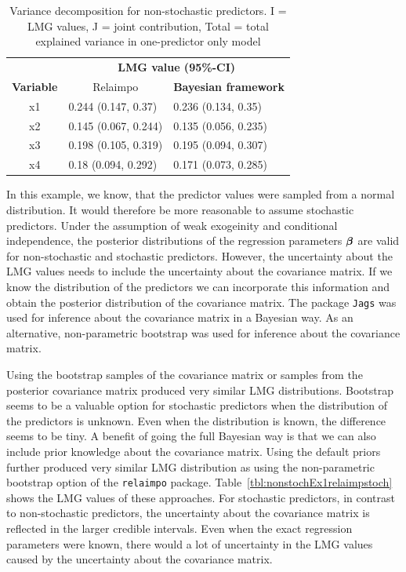 \documentclass[11pt,a4paper,twoside]{book}\usepackage[]{graphicx}\usepackage[]{color}
\begin{document}
\begin{table}[h]
\caption{Variance decomposition for non-stochastic predictors. I = LMG values, J = joint contribution, Total = total explained variance in one-predictor only model}
\centering
\begin{tabular}{cll}
   \toprule
   &\multicolumn{2}{c}{\textbf{LMG value (95\%-CI)}} \\
 \textbf{Variable} & \multicolumn{1}{c}{Relaimpo} & \textbf{Bayesian framework}  \\
  \hline
x1 & 0.244 (0.147, 0.37)  & 0.236 (0.134, 0.35)  \\ 
x2 & 0.145 (0.067, 0.244)  & 0.135 (0.056, 0.235)   \\ 
x3 & 0.198 (0.105, 0.319)  & 0.195 (0.094, 0.307)  \\ 
x4 & 0.18 (0.094, 0.292) & 0.171 (0.073, 0.285)  \\ 
   \bottomrule
\end{tabular}
\label{tbl:nonstochEx1relamip}
\end{table}

\FloatBarrier


In this example, we know, that the predictor values were sampled from a normal distribution. It would therefore be more reasonable to assume stochastic predictors. Under the assumption of weak exogeinity and conditional independence, the posterior distributions of the regression parameters ${\boldsymbol{\beta}}$ are valid for non-stochastic and stochastic predictors. However, the uncertainty about the LMG values needs to include the uncertainty about the covariance matrix. If we know the distribution of the predictors we can incorporate this information and obtain the posterior distribution of the covariance matrix. The package \texttt{Jags} was used for inference about the covariance matrix in a Bayesian way. As an alternative, non-parametric bootstrap was used for inference about the covariance matrix. 

Using the bootstrap samples of the covariance matrix or samples from the posterior covariance matrix produced  very similar LMG distributions. Bootstrap seems to be a valuable option for stochastic predictors when the distribution of the predictors is unknown. Even when the distribution is known, the difference seems to be tiny. A benefit of going the full Bayesian way is that we can also include prior knowledge about the covariance matrix. Using the default priors further produced very similar LMG distribution as using the non-parametric bootstrap option of the \texttt{relaimpo} package. Table~\ref{tbl:nonstochEx1relaimpstoch} shows the LMG values of these approaches. For stochastic predictors, in contrast to non-stochastic predictors, the uncertainty about the covariance matrix is reflected in the larger credible intervals. Even when the exact regression parameters were known, there would a lot of uncertainty in the LMG values caused by the uncertainty about the covariance matrix. 
\end{document}
